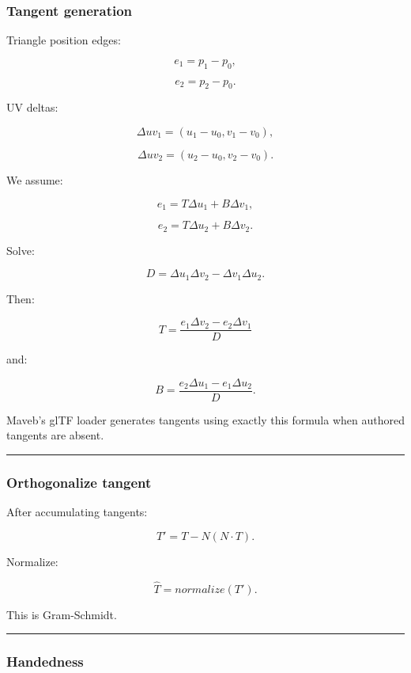 \subsubsection{Tangent generation}\label{tangent-generation}

Triangle position edges:

\[
e_1=p_1-p_0,
\]

\[
e_2=p_2-p_0.
\]

UV deltas:

\[
\Delta uv_1=
(u_1-u_0,v_1-v_0),
\]

\[
\Delta uv_2=
(u_2-u_0,v_2-v_0).
\]

We assume:

\[
e_1=
T\Delta u_1+
B\Delta v_1,
\]

\[
e_2=
T\Delta u_2+
B\Delta v_2.
\]

Solve:

\[
D=
\Delta u_1\Delta v_2
-
\Delta v_1\Delta u_2.
\]

Then:

\[
\boxed{
T=
\frac{
e_1\Delta v_2-
e_2\Delta v_1
}{D}
}
\]

and:

\[
\boxed{
B=
\frac{
e_2\Delta u_1-
e_1\Delta u_2
}{D}.
}
\]

Maveb's glTF loader generates tangents using exactly this formula when authored tangents are absent.

\begin{center}\rule{0.5\linewidth}{0.5pt}\end{center}

\subsubsection{Orthogonalize tangent}\label{orthogonalize-tangent}

After accumulating tangents:

\[
T'
=
T-N(N\cdot T).
\]

Normalize:

\[
\boxed{
\hat T=
normalize(T').
}
\]

This is Gram-Schmidt.

\begin{center}\rule{0.5\linewidth}{0.5pt}\end{center}

\subsubsection{Handedness}\label{handedness}

